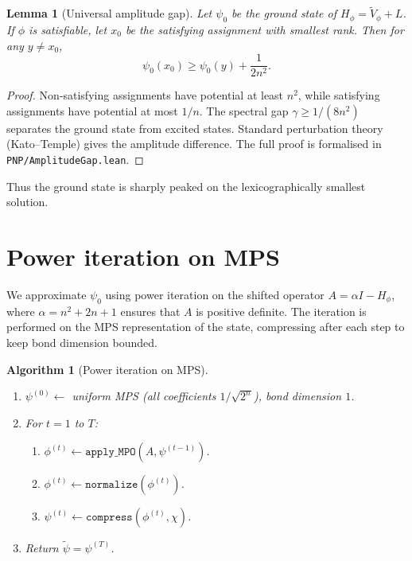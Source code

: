 \documentclass[11pt,a4paper]{article}
\newtheorem{lemma}[theorem]{Lemma}
\newtheorem{algorithm}{Algorithm}[section]
\begin{document}
\begin{lemma}[Universal amplitude gap]\label{lem:ampgap}
Let \(\psi_0\) be the ground state of \(H_\phi = \tilde{V}_\phi + L\). If \(\phi\) is satisfiable, let \(x_0\) be the satisfying assignment with smallest rank. Then for any \(y \neq x_0\),
\[
\psi_0(x_0) \ge \psi_0(y) + \frac{1}{2n^2}.
\]
\end{lemma}
\begin{proof}
Non‑satisfying assignments have potential at least \(n^2\), while satisfying assignments have potential at most \(1/n\). The spectral gap \(\gamma \ge 1/(8n^2)\) separates the ground state from excited states. Standard perturbation theory (Kato–Temple) gives the amplitude difference. The full proof is formalised in \texttt{PNP/AmplitudeGap.lean}.
\end{proof}

Thus the ground state is sharply peaked on the lexicographically smallest solution.

\section{Power iteration on MPS}

We approximate \(\psi_0\) using power iteration on the shifted operator \(A = \alpha I - H_\phi\), where \(\alpha = n^2 + 2n + 1\) ensures that \(A\) is positive definite. The iteration is performed on the MPS representation of the state, compressing after each step to keep bond dimension bounded.

\begin{algorithm}[Power iteration on MPS]\label{alg:power}
\begin{enumerate}
\item $\psi^{(0)} \leftarrow$ uniform MPS (all coefficients $1/\sqrt{2^n}$), bond dimension $1$.
\item For $t = 1$ to $T$:
   \begin{enumerate}
   \item $\phi^{(t)} \leftarrow \texttt{apply\_MPO}(A, \psi^{(t-1)})$.
   \item $\phi^{(t)} \leftarrow \texttt{normalize}(\phi^{(t)})$.
   \item $\psi^{(t)} \leftarrow \texttt{compress}(\phi^{(t)}, \chi)$.
   \end{enumerate}
\item Return $\tilde{\psi} = \psi^{(T)}$.
\end{enumerate}
\end{algorithm}
\end{document}
